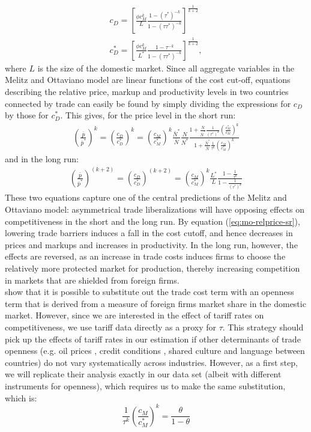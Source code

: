 \documentclass[a4paper,12pt]{article}
\begin{document}
\begin{align}
c_D = \left[ \frac{\phi c_M^k}{L} \frac{1-(\tau^*)^{-k}}{1-(\tau\tau^{*})^{-k}} \right]^{\frac{1}{k+2}} \\
c_D^* = \left[ \frac{\phi c_M^k}{L^*} \frac{1-\tau^{-k}}{1-(\tau\tau^{*})^{-k}} \right]^{\frac{1}{k+2}},
\end{align}
where $L$ is the size of the domestic market. Since all aggregate variables in the Melitz and Ottaviano model are linear functions of the cost cut-off, equations describing the relative price, markup and productivity levels in two countries connected by trade can easily be found by simply dividing the expressions for $c_D$ by those for $c_D^*$. This gives, for the price level in the short run:
\begin{align}
\left( \frac{\bar{p}}{\bar{p}^*} \right)^k = \left( \frac{c_D}{c_D^*} \right)^k = \left(\frac{c_M}{c_M^*} \right)^k \frac{\bar{N}^*}{\bar{N}} \frac{N}{N^*} \frac{1 + \frac{\bar{N}}{\bar{N}^*} \frac{1}{(\tau^*)^k} \left( \frac{c_M^*}{c_M} \right)^k}{1 + \frac{\bar{N}^*}{\bar{N}} \frac{1}{\tau^k} \left( \frac{c_M}{c_M^*} \right)^k} \label{eq:mo-relprice-sr}
\end{align}
and in the long run: 
\begin{align}
\left( \frac{\bar{p}}{\bar{p}^*} \right)^{(k+2)} = \left( \frac{c_D}{c_D^*} \right)^{(k+2)} = \left( \frac{c_M}{c_M^*} \right)^k \frac{L^*}{L} \frac{1-\frac{1}{\tau^k}}{1 - \frac{1}{(\tau^*)^k}} \label{eq:mo-relprice-lr}
\end{align}
These two equations capture one of the central predictions of the Melitz and Ottaviano model: asymmetrical trade liberalizations will have opposing effects on competitiveness in the short and the long run. By equation (\ref{eq:mo-relprice-sr}), lowering trade barriers induces a fall in the cost cutoff, and hence decreases in prices and markups and increases in productivity. In the long run, however, the effects are reversed, as an increase in trade costs induces firms to choose the relatively more protected market for production, thereby increasing competition in markets that are shielded from foreign firms. \\
\citet{Chen2009} show that it is possible to substitute out the trade cost term with an openness term that is derived from a measure of foreign firms market share in the domestic market. However, since we are interested in the effect of tariff rates on competitiveness, we use tariff data directly as a proxy for $\tau$. This strategy should pick up the effects of tariff rates in our estimation if other determinants of trade openness (e.g. oil prices \citep{Kilian2009}, credit conditions \citep{Chor2012}, shared culture and language between countries) do not vary systematically across industries. However, as a first step, we will replicate their analysis exactly in our data set (albeit with different instruments for openness), which requires us to make the same substitution, which is:
\begin{equation}
\frac{1}{\tau^k} \left( \frac{c_M}{c_M^*} \right)^k = \frac{\theta}{1-\theta} 
\end{equation}
\end{document}

